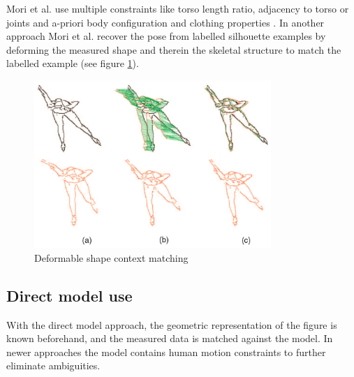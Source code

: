 Mori et al. use multiple constraints like torso length ratio, adjacency to torso or joints and a-priori body configuration and clothing properties \cite{Mori}. In another approach Mori et al. recover the pose from labelled silhouette examples by deforming the measured shape and therein the skeletal structure to match the labelled example \cite{Mori-a} (see figure \ref{fig:deformable}).
\begin{figure}[h!]
\center
\includegraphics[width=0.8\textwidth]{images/seminar/shapecontextmatching.png}
\caption{Deformable shape context matching \cite{Mori-a}}
\label{fig:deformable}
\end{figure}

\subsection{Direct model use}
\label{sub:direct-model-use}

With the direct model approach, the geometric representation of the figure is known beforehand, and the measured data is matched against the model. In newer approaches the model contains human motion constraints to further eliminate ambiguities.

